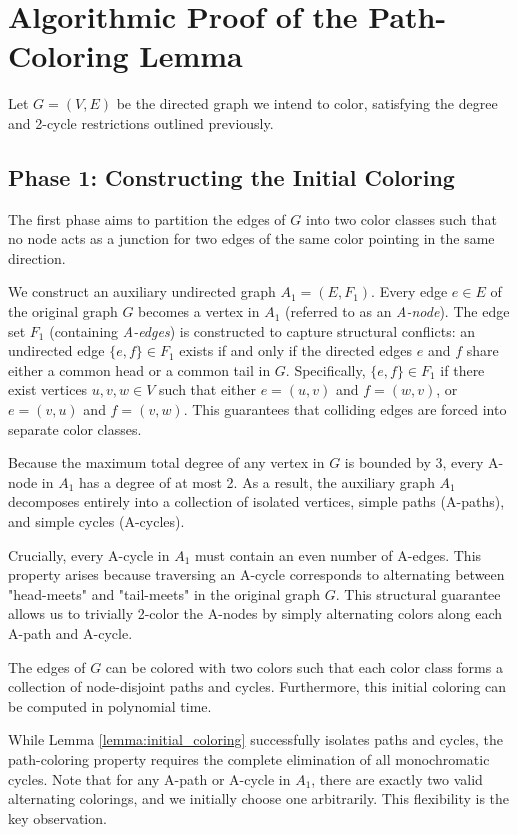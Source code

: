 \section{Algorithmic Proof of the Path-Coloring Lemma}

Let $G = (V, E)$ be the directed graph we intend to color, satisfying the degree
and 2-cycle restrictions outlined previously.

\subsection{Phase 1: Constructing the Initial Coloring}

The first phase aims to partition the edges of $G$ into two color classes such
that no node acts as a junction for two edges of the same color pointing in the
same direction.

We construct an auxiliary undirected graph $A_1 = (E, F_1)$. Every edge $e \in
E$ of the original graph $G$ becomes a vertex in $A_1$ (referred to as an
\textit{A-node}). The edge set $F_1$ (containing \textit{A-edges}) is
constructed to capture structural conflicts: an undirected edge $\{e, f\} \in
F_1$ exists if and only if the directed edges $e$ and $f$ share either a common
head or a common tail in $G$. Specifically, $\{e, f\} \in F_1$ if there exist
vertices $u, v, w \in V$ such that either $e = (u, v)$ and $f = (w, v)$, or $e =
(v, u)$ and $f = (v, w)$. This guarantees that colliding edges are forced into
separate color classes.

Because the maximum total degree of any vertex in $G$ is bounded by 3, every
A-node in $A_1$ has a degree of at most 2. As a result, the auxiliary graph
$A_1$ decomposes entirely into a collection of isolated vertices, simple paths
(A-paths), and simple cycles (A-cycles).

Crucially, every A-cycle in $A_1$ must contain an even number of A-edges. This
property arises because traversing an A-cycle corresponds to alternating between
"head-meets" and "tail-meets" in the original graph $G$. This structural
guarantee allows us to trivially 2-color the A-nodes by simply alternating
colors along each A-path and A-cycle.

\begin{lemma} \label{lemma:initial_coloring}
The edges of $G$ can be colored with two colors such that each color class forms
a collection of node-disjoint paths and cycles. Furthermore, this initial
coloring can be computed in polynomial time.
\end{lemma}
While Lemma \ref{lemma:initial_coloring} successfully isolates paths and cycles,
the path-coloring property requires the complete elimination of all
monochromatic cycles. Note that for any A-path or A-cycle in $A_1$, there are
exactly two valid alternating colorings, and we initially choose one
arbitrarily. This flexibility is the key observation.

